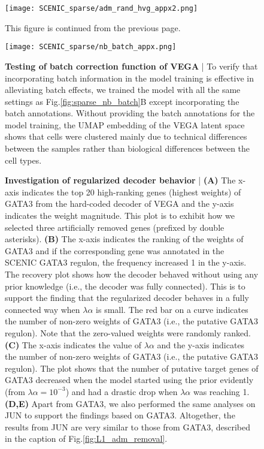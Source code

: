 \addtocounter{figure}{-1}
\begin{figure}[h!]
    \centering
    \hspace*{-17mm}
    \texttt{[image: SCENIC\_sparse/adm\_rand\_hvg\_appx2.png]}
    \caption{\small{This figure is continued from the previous page.}}
\end{figure}

\begin{figure}[h!]
    \centering
    \texttt{[image: SCENIC\_sparse/nb\_batch\_appx.png]}
    \caption{\small{\textbf{Testing of batch correction function of VEGA} | To verify that incorporating batch information in the model training is effective in alleviating batch effects, we trained the model with all the same settings as Fig.\ref{fig:sparse_nb_batch}B except incorporating the batch annotations. Without providing the batch annotations for the model training, the UMAP embedding of the VEGA latent space shows that cells were clustered mainly due to technical differences between the samples rather than biological differences between the cell types.}}
    \label{fig:sparse_nb_batch_appx}
\end{figure}

\begin{figure}[b!]
    \vspace{4cm}
    \caption{\small{\textbf{Investigation of regularized decoder behavior} | \textbf{(A)} The x-axis indicates the top 20 high-ranking genes (highest weights) of GATA3 from the hard-coded decoder of VEGA and the y-axis indicates the weight magnitude. This plot is to exhibit how we selected three artificially removed genes (prefixed by double asterisks). \textbf{(B)} The x-axis indicates the ranking of the weights of GATA3 and if the corresponding gene was annotated in the SCENIC GATA3 regulon, the frequency increased 1 in the y-axis. The recovery plot shows how the decoder behaved without using any prior knowledge (i.e., the decoder was fully connected). This is to support the finding that the regularized decoder behaves in a fully connected way when $\lambda\alpha$ is small. The red bar on a curve indicates the number of non-zero weights of GATA3 (i.e., the putative GATA3 regulon). Note that the zero-valued weights were randomly ranked. \textbf{(C)} The x-axis indicates the value of $\lambda\alpha$ and the y-axis indicates the number of non-zero weights of GATA3 (i.e., the putative GATA3 regulon). The plot shows that the number of putative target genes of GATA3 decreased when the model started using the prior evidently (from $\lambda\alpha = 10^{-3}$) and had a drastic drop when $\lambda\alpha$ was reaching 1. \textbf{(D,E)} Apart from GATA3, we also performed the same analyses on JUN to support the findings based on GATA3. Altogether, the results from JUN are very similar to those from GATA3, described in the caption of Fig.\ref{fig:L1_adm_removal}.}}
\end{figure}

